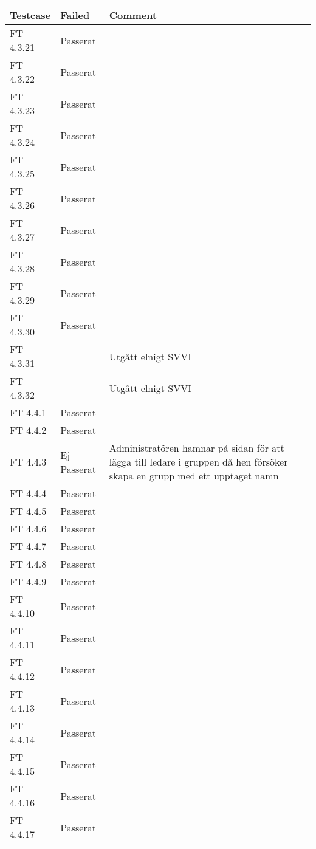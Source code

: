 \documentclass[a4paper]{article}
\begin{document}
\begin{tabular}{| l | l | p{11cm} |}
\hline
Testcase &  Failed & Comment\\
\hline
FT 4.3.21 & Passerat & \\
\hline
FT 4.3.22 & Passerat & \\
\hline
FT 4.3.23 & Passerat & \\
\hline
FT 4.3.24 & Passerat & \\
\hline
FT 4.3.25 & Passerat & \\
\hline
FT 4.3.26 & Passerat & \\
\hline
FT 4.3.27 & Passerat & \\
\hline
FT 4.3.28 & Passerat & \\
\hline
FT 4.3.29 & Passerat & \\
\hline
FT 4.3.30 & Passerat & \\
\hline
FT 4.3.31 & & Utgått elnigt SVVI\\
\hline
FT 4.3.32 & & Utgått elnigt SVVI\\
\hline
FT 4.4.1 & Passerat & \\
\hline
FT 4.4.2 & Passerat & \\
\hline
FT 4.4.3 & Ej Passerat & Administratören hamnar på sidan för att lägga till ledare i gruppen då hen försöker skapa en grupp med ett upptaget namn\\
\hline
FT 4.4.4 & Passerat & \\
\hline
FT 4.4.5 & Passerat & \\
\hline
FT 4.4.6 & Passerat & \\
\hline
FT 4.4.7 & Passerat & \\
\hline
FT 4.4.8 & Passerat & \\
\hline
FT 4.4.9 & Passerat & \\
\hline
FT 4.4.10 & Passerat & \\
\hline
FT 4.4.11 & Passerat & \\
\hline
FT 4.4.12 & Passerat & \\
\hline
FT 4.4.13 & Passerat & \\
\hline
FT 4.4.14 & Passerat & \\
\hline
FT 4.4.15 & Passerat & \\
\hline
FT 4.4.16 & Passerat & \\
\hline
FT 4.4.17 & Passerat & \\
\hline
\end{tabular}
\end{document}
